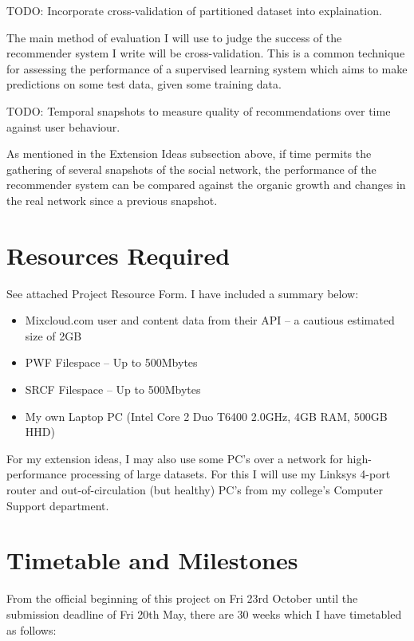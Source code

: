 TODO: Incorporate cross-validation of partitioned dataset into explaination.

The main method of evaluation I will use to judge the success of the recommender system I write will be cross-validation. This is a common technique for assessing the performance of a supervised learning system which aims to make predictions on some test data, given some training data.


TODO: Temporal snapshots to measure quality of recommendations over time against user behaviour.

As mentioned in the Extension Ideas subsection above, if time permits the gathering of several snapshots of the social network, the performance of the recommender system can be compared against the organic growth and changes in the real network since a previous snapshot.



\section{Resources Required}
See attached Project Resource Form. I have included a summary below:
\begin{itemize}
\item Mixcloud.com user and content data from their API -- a cautious estimated size of 2GB
\item PWF Filespace -- Up to 500Mbytes
\item SRCF Filespace  -- Up to 500Mbytes
\item My own Laptop PC (Intel Core 2 Duo T6400 2.0GHz, 4GB RAM, 500GB HHD)
\end{itemize}
For my extension ideas, I may also use some PC's over a network for high-performance processing of large datasets. For this I will use my Linksys 4-port router and out-of-circulation (but healthy) PC's from my college's Computer Support department.


\section{Timetable and Milestones}

From the official beginning of this project on Fri 23rd October until the submission deadline of Fri 20th May, there are 30 weeks which I have timetabled as follows:

